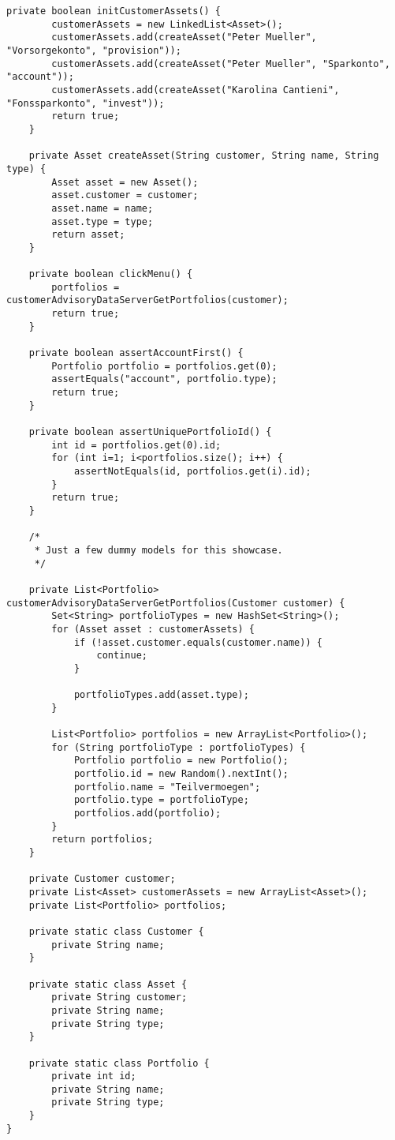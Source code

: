 \begin{lstlisting}[caption=Demand111958\_MigrationDesAnlagezielsAufTvSparvermoegenUndVorsorgevermoegen.java, label=code:fluent_demand]
	private boolean initCustomerAssets() {
		customerAssets = new LinkedList<Asset>();
		customerAssets.add(createAsset("Peter Mueller", "Vorsorgekonto", "provision"));
		customerAssets.add(createAsset("Peter Mueller", "Sparkonto", "account"));
		customerAssets.add(createAsset("Karolina Cantieni", "Fonssparkonto", "invest"));
		return true;
	}

	private Asset createAsset(String customer, String name, String type) {
		Asset asset = new Asset();
		asset.customer = customer;
		asset.name = name;
		asset.type = type;
		return asset;
	}

	private boolean clickMenu() {
		portfolios = customerAdvisoryDataServerGetPortfolios(customer);
		return true;
	}

	private boolean assertAccountFirst() {
		Portfolio portfolio = portfolios.get(0);
		assertEquals("account", portfolio.type);
		return true;
	}

	private boolean assertUniquePortfolioId() {
		int id = portfolios.get(0).id;
		for (int i=1; i<portfolios.size(); i++) {
			assertNotEquals(id, portfolios.get(i).id);
		}
		return true;
	}
	
	/*
	 * Just a few dummy models for this showcase.
	 */
	
	private List<Portfolio> customerAdvisoryDataServerGetPortfolios(Customer customer) {
		Set<String> portfolioTypes = new HashSet<String>();
		for (Asset asset : customerAssets) {
			if (!asset.customer.equals(customer.name)) {
				continue;
			}
			
			portfolioTypes.add(asset.type);
		}
		
		List<Portfolio> portfolios = new ArrayList<Portfolio>();
		for (String portfolioType : portfolioTypes) {
			Portfolio portfolio = new Portfolio();
			portfolio.id = new Random().nextInt();
			portfolio.name = "Teilvermoegen";
			portfolio.type = portfolioType;
			portfolios.add(portfolio);
		}
		return portfolios;
	}
	
	private Customer customer;
	private List<Asset> customerAssets = new ArrayList<Asset>();
	private List<Portfolio> portfolios;
	
	private static class Customer {
		private String name;
	}
	
	private static class Asset {
		private String customer;
		private String name;
		private String type;
	}
	
	private static class Portfolio {
		private int id;
		private String name;
		private String type;
	}
}
\end{lstlisting}















